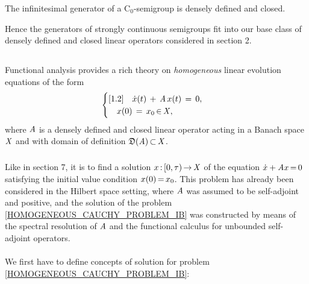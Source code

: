\documentclass[11pt,twoside]{article}
\begin{document}
\begin{theorem}
The infinitesimal generator of a C$_0$-semigroup is densely defined
and closed.
\end{theorem}

Hence the generators of strongly continuous semigroups fit
into our base class of densely defined and closed linear operators
considered in section 2.

\subsection{} %
Functional analysis provides a rich theory
on \textit{homogeneous} linear evolution equations of the form
\begin{equation}\label{HOMOGENEOUS_CAUCHY_PROBLEM_IB}
\begin{cases}[1.2]
\quad \dot{x}(t) \,+\, \mathit{A} \, x(t) \,=\, 0,\\ 
\quad x(0) \,=\, x_0 {\,\in\,} \mathit{X},\\
\end{cases}
\end{equation}
where $\mathit{A}$ is a densely defined and closed linear operator
acting in a Banach space $\mathit{X}$
and with domain of definition $\mathfrak{D}(\mathit{A}) {\,\subset\,} \mathit{X}$.

\subparagraph{}
Like in section 7,
it is to find a solution $x {\,:\,} [0,\tau) {\,\to\,} \mathit{X}$
of the equation $\dot{x} + \mathit{A} x {\,=\,} 0$ 
satisfying the initial value condition $x(0) {\,=\,} x_0$.
This problem has already been considered in the Hilbert space setting,
where $\mathit{A}$ was assumed to be self-adjoint and positive,
and the solution of the problem \eqref{HOMOGENEOUS_CAUCHY_PROBLEM_IB}
was constructed by means of the spectral resolution of $\mathit{A}$
and the functional calculus for unbounded self-adjoint operators.

\paragraph{} %
We first have to define concepts of solution
for problem \eqref{HOMOGENEOUS_CAUCHY_PROBLEM_IB}:
\end{document}
